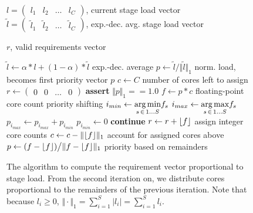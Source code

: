\documentclass[12pt,a4paper]{book}
\DeclarePairedDelimiter\floor{\lfloor}{\rfloor}
\begin{document}
\begin{figure}
\centering
\begin{minipage}{\linewidth}
\begin{algorithmic}[1]
    \algrenewcommand{}
      \Require   \begin{varwidth}[t]{\linewidth}
        \Statex ${l = \begin{pmatrix} l_1 & l_2 & \dots & l_C \end{pmatrix}}$, current stage load vector
        \Statex ${\tilde{l} = \begin{pmatrix} \tilde{l}_1 & \tilde{l}_2 & \dots & \tilde{l}_C \end{pmatrix}}$, exp.-dec. avg. stage load vector
            \strut
               \end{varwidth}
      \Ensure      \begin{varwidth}[t]{\linewidth}
        \Statex $r$, valid requirements vector
          \strut
               \end{varwidth}

    \State $\tilde{l} \gets \alpha * l + (1 - \alpha) * \tilde{l}$ \Comment exp.-dec. average
    \State $p \gets \tilde{l} \big/ \Vert \tilde{l} {\Vert}_1$ \Comment norm. load, becomes first priority vector $p$
    \State $c \gets C$ \Comment number of cores left to assign
    \State $r \gets \begin{pmatrix}0 & 0 & \dots & 0\end{pmatrix}$
        \State \textbf{assert} ${\Vert p {\Vert}_1 == 1.0}$
        \State ${f \gets p * c}$ \Comment floating-point core count
         \Comment priority shifting
            \State $i_{min} \gets \underset{s\,\in\,1 \dots S}{\text{arg\,min}} f_s$
            \State $i_{max} \gets \underset{s\,\in\,1 \dots S}{\text{arg\,max}} f_s$
            \State $p_{i_{max}} \gets p_{i_{max}} + p_{i_{min}}$
            \State $p_{i_{min}} \gets 0$
            \State \textbf{continue}
        \EndIf
        \State ${r \gets r + \floor{f}}$ \Comment assign integer core counts
        \State ${c \gets c - \Vert \floor{f} {\Vert}_1}$ \Comment account for assigned cores above
        \State ${p \gets (f - \floor{f}) \big/  \Vert f - \floor{f} {\Vert}_1 }$ \Comment priority based on remainders
    \EndWhile
\end{algorithmic}
\end{minipage}
\caption{
    The algorithm to compute the requirement vector proportional to stage load.
    From the second iteration on, we distribute cores proportional to the remainders of the previous iteration.
    Note that because ${l_i \ge 0}$, ${\Vert\cdot{\Vert}_1 = \sum_{i = 1}^{S} \vert l_i \vert = \sum_{i = 1}^{S} l_i}$.
}
\label{fig:di:pol:reqvectoralg}
\end{figure}
\end{document}
